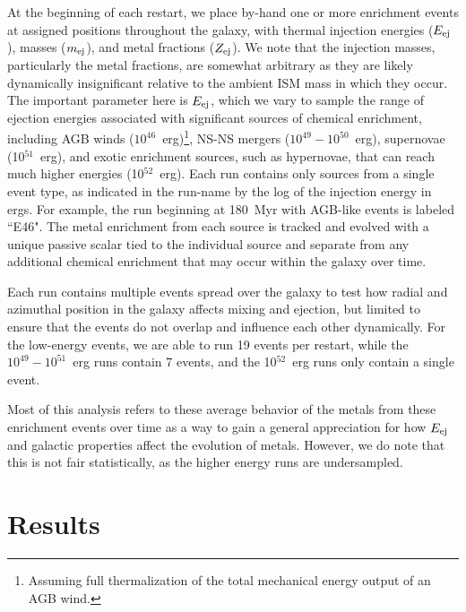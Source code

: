 
At the beginning of each restart, we place by-hand one or more enrichment events at assigned positions throughout the galaxy, with thermal injection energies ($E_{\rm ej}$), masses ($m_{\rm ej}$), and metal fractions ($Z_{\rm ej}$). We note that the injection masses, particularly the metal fractions, are somewhat arbitrary as they are likely dynamically insignificant relative to the ambient ISM mass in which they occur. The important parameter here is $E_{\rm ej}$, which we vary to sample the range of ejection energies associated with significant sources of chemical enrichment, including AGB winds ($10^{46}$~erg)\footnote{Assuming full thermalization of the total mechanical energy output of an AGB wind.}, NS-NS mergers ($10^{49} - 10^{50}$~erg), supernovae (10$^{51}$~erg), and exotic enrichment sources, such as hypernovae, that can reach much higher energies (10$^{52}$~erg). Each run contains only sources from a single event type, as indicated in the run-name by the log of the injection energy in ergs. For example, the run beginning at 180~Myr with AGB-like events is labeled ``\runone E46". The metal enrichment from each source is tracked and evolved with a unique passive scalar tied to the individual source and separate from any additional chemical enrichment that may occur within the galaxy over time.

Each run contains multiple events spread over the galaxy to test how radial and azimuthal position in the galaxy affects mixing and ejection, but limited to ensure that the events do not overlap and influence each other dynamically. For the low-energy events, we are able to run 19 events per restart, while the $10^{49}-10^{51}$~erg runs contain 7 events, and the 10$^{52}$~erg runs only contain a single event.

Most of this analysis refers to these average behavior of the metals from these enrichment events over time as a way to gain a general appreciation for how $E_{\rm ej}$ and galactic properties affect the evolution of metals. However, we do note that this is not fair statistically, as the higher energy runs are undersampled.



\section{Results}

